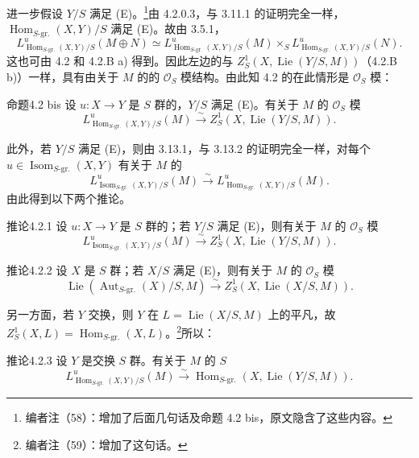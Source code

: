 进一步假设 $Y/S$ 满足 (E)。\footnote{编者注（58）：增加了后面几句话及命题 4.2 bis，原文隐含了这些内容。}由 4.2.0.3，与 3.11.1 的证明完全一样，$\operatorname{Hom}_{S\text{-gr.}}(X,Y)/S$ 满足 (E)。故由 3.5.1，
\[L^u_{\operatorname{Hom}_{S\text{-gr.}}(X,Y)/S}(M\oplus N)\simeq L^u_{\operatorname{Hom}_{S\text{-gr.}}(X,Y)/S}(M)\times_SL^u_{\operatorname{Hom}_{S\text{-gr.}}(X,Y)/S}(N).\]
这也可由 4.2 和 4.2.B a) 得到。因此左边的与 $Z^1_S(X,\operatorname{Lie}(Y/S,M))$（4.2.B b)）一样，具有由关于 $M$ 的的 $\mathcal O_S$ 模结构。由此知 4.2 的在此情形是 $\mathcal O_S$ 模：
\begin{SGAresult}{命题}{4.2 bis}
设 $u:X\to Y$ 是 $S$ 群的，$Y/S$ 满足 (E)。有关于 $M$ 的 $\mathcal O_S$ 模
\[L^u_{\operatorname{Hom}_{S\text{-gr.}}(X,Y)/S}(M)\xrightarrow{\sim}Z^1_S(X,\operatorname{Lie}(Y/S,M)).\]
\end{SGAresult}
此外，若 $Y/S$ 满足 (E)，则由 3.13.1，与 3.13.2 的证明完全一样，对每个 $u\in\operatorname{Isom}_{S\text{-gr.}}(X,Y)$ 有关于 $M$ 的
\[L^u_{\operatorname{Isom}_{S\text{-gr.}}(X,Y)/S}(M)\xrightarrow{\sim}L^u_{\operatorname{Hom}_{S\text{-gr.}}(X,Y)/S}(M).\tag{*}\]
由此得到以下两个推论。
\begin{SGAresult}{推论}{4.2.1}
设 $u:X\to Y$ 是 $S$ 群的；若 $Y/S$ 满足 (E)，则有关于 $M$ 的 $\mathcal O_S$ 模
\[L^u_{\operatorname{Isom}_{S\text{-gr.}}(X,Y)/S}(M)\xrightarrow{\sim}Z^1_S(X,\operatorname{Lie}(Y/S,M)).\]
\end{SGAresult}
\begin{SGAresult}{推论}{4.2.2}
设 $X$ 是 $S$ 群；若 $X/S$ 满足 (E)，则有关于 $M$ 的 $\mathcal O_S$ 模
\[\operatorname{Lie}(\operatorname{Aut}_{S\text{-gr.}}(X)/S,M)\xrightarrow{\sim}Z^1_S(X,\operatorname{Lie}(X/S,M)).\]
\end{SGAresult}
另一方面，若 $Y$ 交换，则 $Y$ 在 $L=\operatorname{Lie}(X/S,M)$ 上的平凡，故 $Z^1_S(X,L)=\operatorname{Hom}_{S\text{-gr.}}(X,L)$。\footnote{编者注（59）：增加了这句话。}所以：
\begin{SGAresult}{推论}{4.2.3}
设 $Y$ 是交换 $S$ 群。有关于 $M$ 的 $S$ 
\[L^u_{\operatorname{Hom}_{S\text{-gr.}}(X,Y)/S}(M)\xrightarrow{\sim}\operatorname{Hom}_{S\text{-gr.}}(X,\operatorname{Lie}(Y/S,M)).\]
\end{SGAresult}
